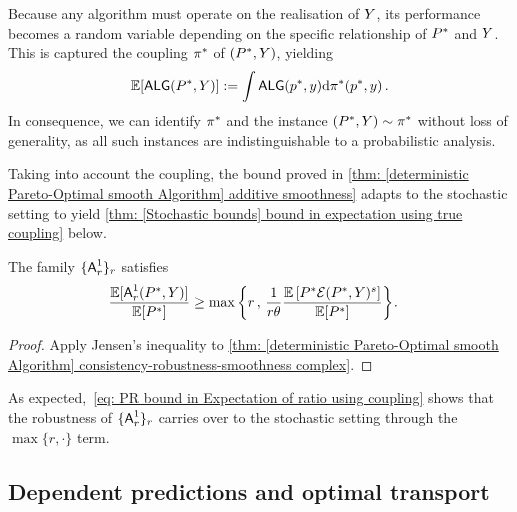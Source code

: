 Because any algorithm must operate on the realisation of $Y$, its performance becomes a random variable depending on the specific relationship of $P^*$ and $Y$. This is captured the coupling $\pi^*$ of $(P^*,Y)$, yielding
\begin{align}
    \mathbb{E}[\mbox{\textup{\textsf{ALG}}}(P^*,Y)]:=\int \mbox{\textup{\textsf{ALG}}}(p^*,y) \mathrm{d}\pi^*(p^*,y)\,. \label{eq: expectation=coupling integral}
\end{align}
In consequence, we can identify $\pi^*$ and the instance $(P^*,Y)\sim\pi^*$ without loss of generality, as all such instances are indistinguishable to a probabilistic analysis. 


Taking into account the coupling, the bound proved in \cref{thm: [deterministic Pareto-Optimal smooth Algorithm] additive smoothness} adapts to the stochastic setting to yield \cref{thm: [Stochastic bounds] bound in expectation using true coupling} below.


\begin{lemma}\label{thm: [Stochastic bounds] bound in expectation using true coupling}
The family $\{\mbox{\textup{\textsf{A}}}^1_r\}_{r}$ satisfies 
    \begin{align}
     \hspace{-1em}\frac{\mathbb{E}[\mbox{\textup{\textsf{A}}}^1_r(P^*,Y)]}{\mathbb{E}[P^*]}\ge \max\left\{r\,,\, \frac{1}{r\theta}\frac{\mathbb{E}\left[P^*\mathcal{E}(P^*,Y)^{s}\right]}{\mathbb{E}[P^*]}\right\}\hspace{-1pt}.\label{eq: PR bound in Expectation of ratio using coupling}
    \end{align}
\end{lemma}

\begin{proof}
    Apply Jensen's inequality to \cref{thm: [deterministic Pareto-Optimal smooth Algorithm] consistency-robustness-smoothness complex}.
\end{proof}
As expected,~\eqref{eq: PR bound in Expectation of ratio using coupling} shows that the robustness of $\{\mbox{\textup{\textsf{A}}}^1_r\}_{r}$ carries over to the stochastic setting through the $\max\{r,\cdot\}$ term.






\subsection{Dependent predictions and optimal transport}\label{subsec: OT}


